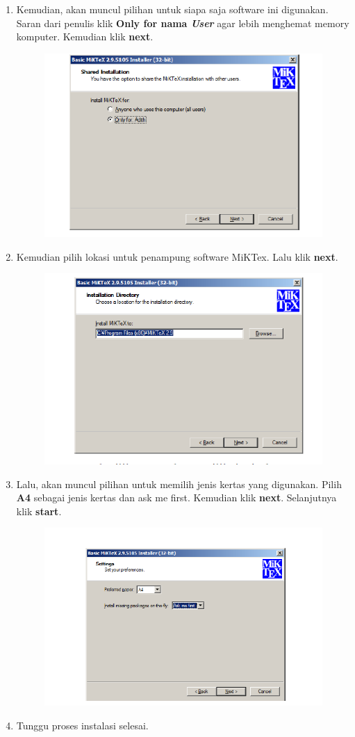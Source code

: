 \begin{enumerate}
\newpage
\item Kemudian, akan muncul pilihan untuk siapa saja software ini digunakan. Saran dari penulis klik {\bf Only for nama \itshape User} agar lebih menghemat memory komputer. Kemudian klik {\bf next}.
\begin{figure}[h!]
    \centering
    \includegraphics[width =10 cm]{img/20.png}
	\label{picture label}
\end{figure}
\item Kemudian pilih lokasi untuk penampung software MiKTex. Lalu klik {\bf next}.
\begin{figure}[h!]
    \centering
    \includegraphics[width =10  cm]{img/21.png}
	\label{picture label}
\end{figure}
\item Lalu, akan muncul pilihan untuk memilih jenis kertas yang digunakan. Pilih {\bf A4} sebagai jenis kertas dan ask me first. Kemudian klik {\bf next}. Selanjutnya klik {\bf start}.
\newpage
\begin{figure}[h!]
\centering
\includegraphics[width =10 cm]{img/22.png}
\end{figure}
\item Tunggu proses instalasi selesai.
\end{enumerate}
